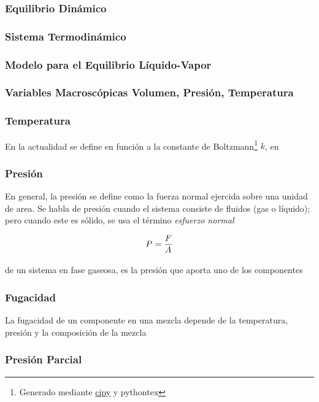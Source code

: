 \subsubsection{Equilibrio Dinámico}
\subsubsection{Sistema Termodinámico}

\subsubsection*{Modelo para el Equilibrio Líquido-Vapor}
\subsubsection*{Variables Macroscópicas Volumen, Presión, Temperatura}

\subsubsection{Temperatura}
En la actualidad se define en función a la constante de Boltzmann\footnote{Generado mediante \href{https://docs.scipy.org/doc/scipy/reference/constants.html}{cipy} y pythontex} {$k$},  en
\subsubsection{Presión}
En general, la presión se define como la fuerza normal ejercida sobre una unidad de area. Se habla de presión cuando el sistema consiste de fluidos (gas o líquido); pero cuando este es sólido, se usa el término \textit{esfuerzo normal} \textcite{YunusA.Cengel2015}

\begin{equation}
   P_{}^{} = \frac{{F}_{}^{}}{{A}_{}^{}} 
\end{equation}

\figMolecularColissions

de un sistema en fase gaseosa, es la presión que aporta uno de los componentes


\subsubsection{Fugacidad}
    La fugacidad de un componente en una mezcla depende de la temperatura, presión y la composición de la mezcla \parencite[p. 248]{ReidPrausnitzPoling1987}

\subsubsection{Presión Parcial}

